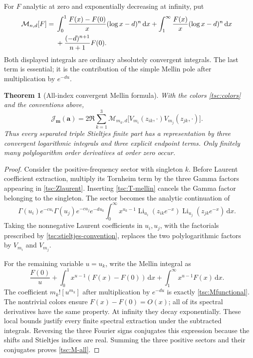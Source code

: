 \documentclass[11pt]{article}
\numberwithin{equation}{section}
\newtheorem{theorem}{Theorem}[section]
\theoremstyle{definition}\newtheorem{definition}[theorem]{Definition}
\theoremstyle{remark}\newtheorem{remark}[theorem]{Remark}
\DeclareMathOperator{\Li}{Li}
\newcommand{\dd}{\,\mathrm d}
\newcommand{\calJ}{\mathcal J}
\newcommand{\calM}{\mathcal M}
\begin{document}
For $F$ analytic at zero and exponentially decreasing at infinity, put
\begin{align}\label{tsc:Mfunctional}
 \calM_{n,d}[F]={}&
    \int_0^1\frac{F(x)-F(0)}x(\log x-d)^n\dd x
   +\int_1^\infty\frac{F(x)}x(\log x-d)^n\dd x\notag\\
 &+\frac{(-d)^{n+1}}{n+1}F(0).
\end{align}
Both displayed integrals are ordinary absolutely convergent integrals.
The last term is essential; it is the contribution of the simple Mellin
pole after multiplication by $e^{-du}$.

\begin{theorem}[All-index convergent Mellin formula]\label{tsc:mellin-all}
With the colors \eqref{tsc:colors} and the conventions above,
\begin{equation}\label{tsc:M-all}
 \boxed{\displaystyle
 \calJ_{\mathbf m}(\mathbf a)=2\Re\sum_{k=1}^3
 \calM_{m_k,d}\!\big[
       V_{m_i}(z_{ik},\cdot)V_{m_j}(z_{jk},\cdot)\big].}
\end{equation}
Thus every separated triple Stieltjes finite part has a representation by
three convergent logarithmic integrals and three explicit endpoint terms.
Only finitely many polylogarithm order derivatives at order zero occur.
\end{theorem}
\begin{proof}
Consider the positive-frequency sector with singleton $k$. Before Laurent
coefficient extraction, multiply its Tornheim term by the three Gamma
factors appearing in \eqref{tsc:Zlaurent}. Inserting
\eqref{tsc:T-mellin} cancels the Gamma factor belonging to the singleton.
The sector becomes the analytic continuation of
\begin{equation}\label{tsc:sector-mellin}
 \Gamma(u_i)e^{-cu_i}\Gamma(u_j)e^{-cu_j}e^{-du_k}
 \int_0^\infty x^{u_k-1}
           \Li_{u_i}(z_{ik}e^{-x})\Li_{u_j}(z_{jk}e^{-x})\dd x.
\end{equation}
Taking the nonnegative Laurent coefficients in $u_i,u_j$, with the
factorials prescribed by \eqref{tsc:stieltjes-convention}, replaces the two
polylogarithmic factors by $V_{m_i}$ and $V_{m_j}$.

For the remaining variable $u=u_k$, write the Mellin integral as
\[
 \frac{F(0)}u+
 \int_0^1x^{u-1}(F(x)-F(0))\dd x+
 \int_1^\infty x^{u-1}F(x)\dd x.
\]
The coefficient $m_k![u^{m_k}]$ after multiplication by $e^{-du}$ is exactly
\eqref{tsc:Mfunctional}. The nontrivial colors ensure $F(x)-F(0)=O(x)$;
all of its spectral derivatives have the same property. At infinity they
decay exponentially. These local bounds justify every finite spectral
extraction under the subtracted integrals. Reversing the three Fourier
signs conjugates this expression because the shifts and Stieltjes indices
are real. Summing the three positive sectors and their conjugates proves
\eqref{tsc:M-all}.
\end{proof}
\end{document}
